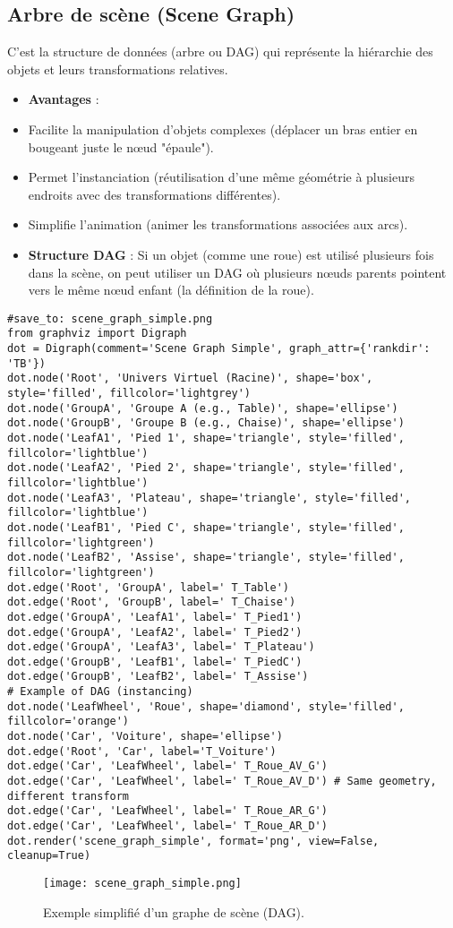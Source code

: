 \subsection{Arbre de scène (Scene Graph)}
C'est la structure de données (arbre ou DAG) qui représente la hiérarchie des objets et leurs transformations relatives.
\begin{itemize}
    \item \textbf{Avantages} :
        \item Facilite la manipulation d'objets complexes (déplacer un bras entier en bougeant juste le nœud "épaule").
        \item Permet l'instanciation (réutilisation d'une même géométrie à plusieurs endroits avec des transformations différentes).
        \item Simplifie l'animation (animer les transformations associées aux arcs).
    \item \textbf{Structure DAG} : Si un objet (comme une roue) est utilisé plusieurs fois dans la scène, on peut utiliser un DAG où plusieurs nœuds parents pointent vers le même nœud enfant (la définition de la roue).
\end{itemize}
\begin{verbatim}
#save_to: scene_graph_simple.png
from graphviz import Digraph
dot = Digraph(comment='Scene Graph Simple', graph_attr={'rankdir': 'TB'})
dot.node('Root', 'Univers Virtuel (Racine)', shape='box', style='filled', fillcolor='lightgrey')
dot.node('GroupA', 'Groupe A (e.g., Table)', shape='ellipse')
dot.node('GroupB', 'Groupe B (e.g., Chaise)', shape='ellipse')
dot.node('LeafA1', 'Pied 1', shape='triangle', style='filled', fillcolor='lightblue')
dot.node('LeafA2', 'Pied 2', shape='triangle', style='filled', fillcolor='lightblue')
dot.node('LeafA3', 'Plateau', shape='triangle', style='filled', fillcolor='lightblue')
dot.node('LeafB1', 'Pied C', shape='triangle', style='filled', fillcolor='lightgreen')
dot.node('LeafB2', 'Assise', shape='triangle', style='filled', fillcolor='lightgreen')
dot.edge('Root', 'GroupA', label=' T_Table')
dot.edge('Root', 'GroupB', label=' T_Chaise')
dot.edge('GroupA', 'LeafA1', label=' T_Pied1')
dot.edge('GroupA', 'LeafA2', label=' T_Pied2')
dot.edge('GroupA', 'LeafA3', label=' T_Plateau')
dot.edge('GroupB', 'LeafB1', label=' T_PiedC')
dot.edge('GroupB', 'LeafB2', label=' T_Assise')
# Example of DAG (instancing)
dot.node('LeafWheel', 'Roue', shape='diamond', style='filled', fillcolor='orange')
dot.node('Car', 'Voiture', shape='ellipse')
dot.edge('Root', 'Car', label='T_Voiture')
dot.edge('Car', 'LeafWheel', label=' T_Roue_AV_G')
dot.edge('Car', 'LeafWheel', label=' T_Roue_AV_D') # Same geometry, different transform
dot.edge('Car', 'LeafWheel', label=' T_Roue_AR_G')
dot.edge('Car', 'LeafWheel', label=' T_Roue_AR_D')
dot.render('scene_graph_simple', format='png', view=False, cleanup=True)
\end{verbatim}
\begin{figure}[H]
\centering
\texttt{[image: scene\_graph\_simple.png]}
\caption{Exemple simplifié d'un graphe de scène (DAG).}
\label{fig:scene_graph_simple}
\end{figure}
